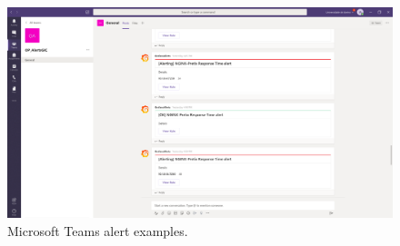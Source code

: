 \documentclass[12pt]{article}
\begin{document}
\begin{figure}[H]
  \includegraphics[width=\linewidth]{images/alerts.png}
  \caption{Microsoft Teams alert examples.}
  \label{fig:alerts}
\end{figure}
\end{document}
